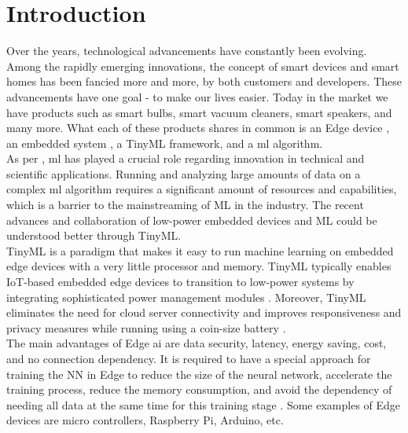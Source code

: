 %
%
%
%

\chapter{Introduction}

Over the years, technological advancements have constantly been evolving. Among the rapidly emerging innovations, the concept of smart devices and smart homes has been fancied more and more, by both customers and developers. These advancements have one goal - to make our lives easier. Today in the market we have products such as smart bulbs, smart vacuum cleaners, smart speakers, and many more. What each of these products shares in common is an Edge device \autocite{Posey:2020}, an embedded system \autocite{Reidt:2022}, a TinyML framework, and a \ac{ml} algorithm.\\

As per \autocite{Osman:2021}, \ac{ml} has played a crucial role regarding innovation in technical and scientific applications. Running and analyzing large amounts of data on a complex \ac{ml} algorithm requires a significant amount of resources and capabilities, which is a barrier to the mainstreaming of ML in the industry. The recent advances and collaboration of low-power embedded devices and ML could be understood better through TinyML.\\ 

TinyML is a paradigm that makes it easy to run machine learning on embedded edge devices with a very little processor and memory. TinyML typically enables IoT-based embedded edge devices to transition to low-power systems by integrating sophisticated power management modules \autocite{Ray:2022}. Moreover, TinyML eliminates the need for cloud server connectivity and improves responsiveness and privacy measures while running using a coin-size battery \autocite{Osman:2021}.\\

The main advantages of Edge \ac{ai} are data security, latency, energy saving, cost, and no connection dependency. It is required to have a special approach for training the \ac{NN} in Edge to reduce the size of the neural network, accelerate the training process, reduce the memory consumption, and avoid the dependency of needing all data at the same time for this training stage \autocite{Rüb:2022}. Some examples of Edge devices are micro controllers, Raspberry Pi, Arduino, etc.\\


